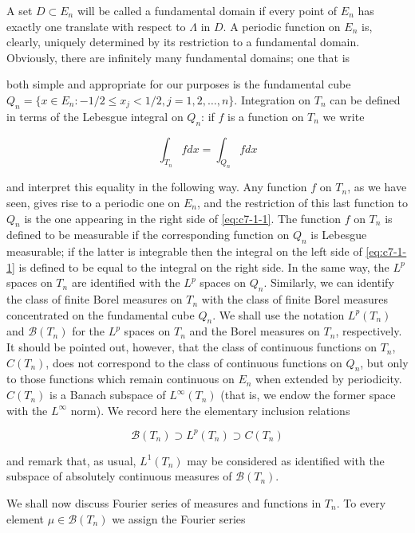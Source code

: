 A set $D \subset E_n$ will be called a fundamental domain if every point of $E_n$ has exactly one translate with respect to $\Lambda$ in $D$. A periodic function on $E_n$ is, clearly, uniquely determined by its restriction to a fundamental domain. Obviously, there are infinitely many fundamental domains; one that is

both simple and appropriate for our purposes is the fundamental cube $Q_n = \{x \in E_n: -1/2 \leq x_j < 1/2, j = 1, 2, \ldots, n\}$. Integration on $T_n$ can be defined in terms of the Lebesgue integral on $Q_n$: if $f$ is a function on $T_n$ we write

\begin{equation}\label{eq:c7-1-1}
\int_{T_{n}}f dx=\int_{Q_{n}}f dx
\end{equation}

and interpret this equality in the following way. Any function $f$ on $T_n$, as we have seen, gives rise to a periodic one on $E_n$, and the restriction of this last function to $Q_n$ is the one appearing in the right side of \eqref{eq:c7-1-1}. The function $f$ on $T_n$ is defined to be measurable if the corresponding function on $Q_n$ is Lebesgue measurable; if the latter is integrable then the integral on the left side of \eqref{eq:c7-1-1} is defined to be equal to the integral on the right side. In the same way, the $L^p$ spaces on $T_n$ are identified with the $L^p$ spaces on $Q_n$. Similarly, we can identify the class of finite Borel measures on $T_n$ with the class of finite Borel measures concentrated on the fundamental cube $Q_n$. We shall use the notation $L^p(T_n)$ and $\mathcal{B}(T_n)$ for the $L^p$ spaces on $T_n$ and the Borel measures on $T_n$, respectively. It should be pointed out, however, that the class of continuous functions on $T_n$, $C(T_n)$, does not correspond to the class of continuous functions on $Q_n$, but only to those functions which remain continuous on $E_n$ when extended by periodicity. $C(T_n)$ is a Banach subspace of $L^\infty(T_n)$ (that is, we endow the former space with the $L^\infty$ norm). We record here the elementary inclusion relations

\[
\mathcal{B}(T_{n})\supset L^{p}(T_{n})\supset C(T_{n})
\]

and remark that, as usual, $L^{1}(T_{n})$ may be considered as identified with the subspace of absolutely continuous measures of $\mathcal{B}(T_{n})$.

We shall now discuss Fourier series of measures and functions in $T_n$. To every element $\mu \in \mathcal{B}(T_n)$ we assign the Fourier series

